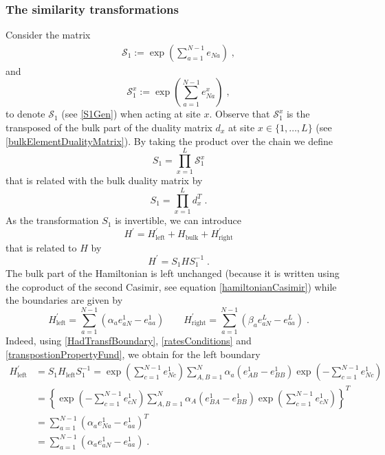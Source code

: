\documentclass[10pt]{article}
\numberwithin{equation}{section}
\numberwithin{equation}{subsection}
\newcommand{\co}{\;,}
\newcommand{\dt}{\;.}
\begin{document}
\subsubsection{The similarity transformations}\label{subsectionSTransf}
Consider the matrix
\begin{align}
	\mathcal{S}_{1}:=\exp{\left(\sum_{a=1}^{N-1}e_{Na}\right)}\label{S1Gen}\co
\end{align}
and
\begin{equation}\label{transformationV}
 \mathcal{S}_{1}^{x}:=\exp{\left(\sum_{a=1}^{N-1}e_{Na}^{x}\right)}\co 
\end{equation}
to denote $\mathcal{S}_{1}$ (see \eqref{S1Gen}) when acting at site $x$. 
Observe that $\mathcal{S}_{1}^{x}$ is the transposed of the bulk part of the duality matrix $d_{x}$  at site $x\in \{1,\ldots,L\}$ (see \eqref{bulkElementDualityMatrix}). By taking the product over the chain we define
\begin{equation}\label{S1-Whole}
    S_{1}=\prod_{x=1}^{L}\mathcal{S}_{1}^{x}
\end{equation}
that is related with the bulk duality matrix by 
\begin{equation}
S_{1}=\prod_{x=1}^{L}d_{x}^{T}\dt
\end{equation}
 As the transformation $S_{1}$ is invertible,  we can introduce 
\begin{equation}\label{hatHamiltonian}
   H^{'}=H^{'}_{\text{left}}+H_{\text{bulk}}+H^{'}_{\text{right}}
\end{equation}
that is related to $H$ by
\begin{equation}\label{similarV}
   H^{'}=S_{1}HS_{1}^{-1}\dt
\end{equation}
The bulk part of the Hamiltonian is left unchanged (because it is written using the coproduct of the second Casimir, see equation \eqref{hamiltonianCasimir}) while the boundaries are given by 
\begin{equation}\label{eq:Hprimes}
	H^{'}_{\text{left}}=\sum_{a=1}^{N-1}\left(\alpha_{a}e_{aN}^{1}-e_{aa}^{1}\right)\qquad H^{'}_{\text{right}}=\sum_{a=1}^{N-1}\left(\beta_{a}e_{aN}^{L}-e_{aa}^{L}\right)\dt
\end{equation}
Indeed, using \eqref{HadTransfBoundary}, \eqref{ratesConditions} and \eqref{transpostionPropertyFund}, we obtain for the left boundary
\begin{equation}
	\begin{split}
		H_{\text{left}}^{'}&=S_{1}H_{\text{left}}S_{1}^{-1}=\exp{\left(\sum_{c=1}^{N-1}e_{Nc}^{1}\right)}\sum_{A,B=1}^{N}\alpha_{a}\left(e_{AB}^{1}-e_{BB}^{1}\right)\exp{\left(-\sum_{c=1}^{N-1}e_{Nc}^{1}\right)}
		\\&=
		\left\{\exp{\left(-\sum_{c=1}^{N-1}e_{cN}^{1}\right)}\sum_{A,B=1}^{N}\alpha_{A}\left(e_{BA}^{1}-e_{BB}^{1}\right)\exp{\left(\sum_{c=1}^{N-1}e_{cN}^{1}\right)}\right\}^{T}
		\\&=
		\sum_{a=1}^{N-1}\left(\alpha_{a}e_{Na}^{1}-e_{aa}^{1}\right)^{T}
		\\&=
		\sum_{a=1}^{N-1}\left(\alpha_{a}e_{aN}^{1}-e_{aa}^{1}\right)\dt
	\end{split}
\end{equation}
\end{document}
